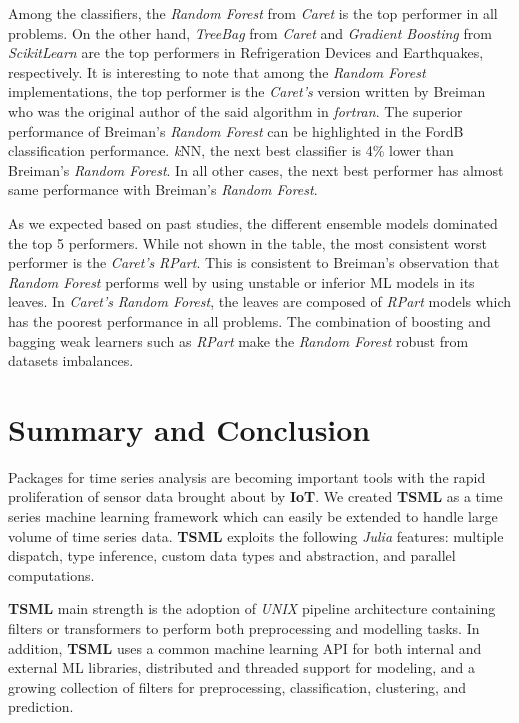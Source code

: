 \documentclass{juliacon}
\begin{document}
\vskip 6pt

Among the classifiers, the \emph{Random Forest} from \emph{Caret} is the top performer in all problems. On the other hand, \emph{TreeBag} from \emph{Caret} and \emph{Gradient Boosting} from \emph{ScikitLearn} are the top performers in Refrigeration Devices and Earthquakes, respectively. It is interesting to note that among the \emph{Random Forest} implementations, the top performer is the \emph{Caret's} version written by Breiman\cite{Breiman2001} who was the original author of the said algorithm in \emph{fortran}. The superior performance of Breiman's \emph{Random Forest} can be highlighted in the FordB classification performance.  \emph{k}NN, the next best classifier is 4\% lower than Breiman's \emph{Random Forest}. In all other cases, the next best performer has almost same performance with  Breiman's \emph{Random Forest}.
 
\vskip 6pt
 
As we expected based on past studies, the different ensemble models dominated the top 5 performers. While not shown in the table, the most consistent worst performer is the \emph{Caret's} \emph{RPart}. This is consistent to Breiman's observation that \emph{Random Forest} performs well by using unstable or inferior ML models in its leaves. In \emph{Caret's} \emph{Random Forest}, the leaves are composed of \emph{RPart} models which has the poorest performance in all problems. The combination of boosting and bagging weak learners such as \emph{RPart} make the \emph{Random Forest} robust from datasets imbalances. 
 
\section{Summary and Conclusion}
Packages for time series analysis are becoming important tools with the rapid proliferation of sensor data brought about by \textbf{IoT}.  We created \textbf{TSML} as a time series machine learning framework which can easily be extended to handle large volume of time series data. 
\textbf{TSML}  exploits the following \emph{Julia} features: multiple dispatch, type inference, custom data types and abstraction, and parallel computations. 

\vskip 6pt

\textbf{TSML} main strength is the adoption of \emph{UNIX} pipeline architecture containing filters or transformers to perform both preprocessing and modelling tasks.  In addition, \textbf{TSML} uses a common machine learning API for both internal and external ML libraries, distributed and threaded support for modeling, and a growing collection of filters for preprocessing, classification, clustering, and prediction. 
\end{document}
